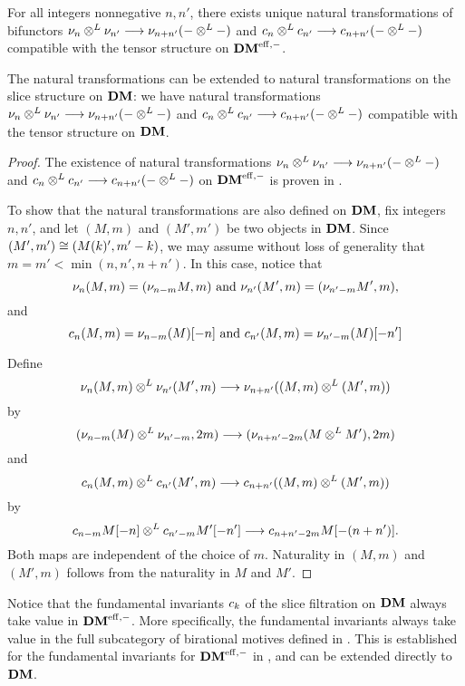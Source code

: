 \begin{cor}
For all integers nonnegative $n, n'$, there exists unique
natural transformations of bifunctors $\sliceDM{n} \tDM 
\sliceDM{n'} \to \sliceDM{n + n'}(- \tDM -)$ and $\fIDM{n} \tDM
\fIDM{n'} \to \fIDM{n + n'}(- \tDM -)$ compatible with the tensor 
structure on $\DMeff$.

The natural transformations can be extended to natural 
transformations on the slice structure on $\DM$: we have natural 
transformations $\sliceDM{n} \tDM \sliceDM{n'} \to 
\sliceDM{n + n'}(- \tDM -)$ and $\fIDM{n} \tDM \fIDM{n'} \to 
\fIDM{n + n'}(- \tDM -)$ compatible with the tensor structure on 
$\DM$.
\end{cor}
\begin{proof}
The existence of natural transformations $\sliceDM{n} \tDM 
\sliceDM{n'} \to \sliceDM{n + n'}(- \tDM -)$ and $\fIDM{n} \tDM 
\fIDM{n'} \to \fIDM{n + n'}(- \tDM -)$ on $\DMeff$ is proven
in \cite[1.6]{HuKa}.

To show that the natural transformations are also defined on 
$\DM$, fix integers $n, n'$, and let $(M, m)$ and $(M', m')$ be 
two objects in $\DM$. Since $(M',m') \cong (\tZ[k]M', m' - k)$, 
we may assume without loss of generality that $m = m' < 
\min(n, n', n + n')$. In this case, notice that
\[
\sliceDM{n}(M, m) = (\sliceDM{n - m}M, m) 
\textrm{ and }
\sliceDM{n'}(M', m) = (\sliceDM{n' - m}M', m),
\]
and
\[
\fIDM{n}(M, m) = \sliceDM{n - m}(M)[-n]
\textrm{ and }
\fIDM{n'}(M, m) = \sliceDM{n' - m}(M)[-n']
\]

Define
\[
\sliceDM{n}(M, m) \tDM \sliceDM{n'}(M',m)
\to \sliceDM{n + n'}((M, m) \tDM (M',m))
\]
by
\[
(\sliceDM{n - m}(M) \tDM \sliceDM{n' - m}, 2m) \to
   (\sliceDM{n + n' - 2m}(M \tDM M'), 2m)
\]
and
\[
\fIDM{n}(M, m) \tDM \fIDM{n'}(M',m)
\to \fIDM{n + n'}((M, m) \tDM (M',m))
\]
by
\[
\fIDM{n - m}M[-n] \tDM \fIDM{n' - m}M'[-n']
\to \fIDM{n + n' - 2m}M[-(n + n')].
\]
Both maps are independent of the choice of $m$. Naturality in 
$(M, m)$ and $(M', m)$ follows from the naturality in $M$ and 
$M'$.
\end{proof}

\begin{rmk}
Notice that the fundamental invariants $\fIDM{k}$ of the slice 
filtration on $\DM$ always take value in $\DMeff$. More 
specifically, the fundamental invariants always take value in the 
full subcategory of birational motives defined in \cite{KaSu}. 
This is established for the fundamental invariants for $\DMeff$ 
in \cite[Section 2]{HuKa}, and can be extended directly to $\DM$.
\end{rmk}
